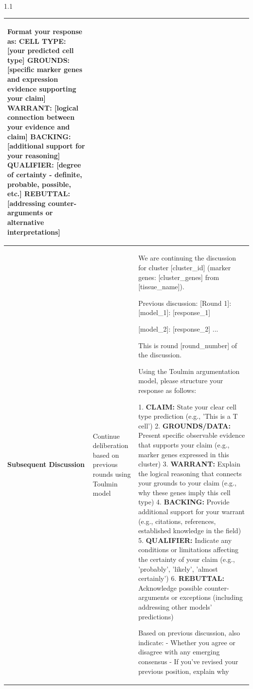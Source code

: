 \documentclass[11pt]{article}
\begin{document}
\begin{landscape}
\begin{spacing}{1.1}
\begin{longtable}{>{\raggedright\arraybackslash}p{2.5cm}>{\raggedright\arraybackslash}p{3cm}>{\raggedright\arraybackslash}p{15cm}}
\begin{tcolorbox}[colback=white,colframe=naturelightgray,boxrule=0.5pt,arc=0pt,left=5pt,right=5pt,top=5pt,bottom=5pt]
Format your response as:
\textbf{CELL TYPE:} [your predicted cell type]
\textbf{GROUNDS:} [specific marker genes and expression evidence supporting your claim]
\textbf{WARRANT:} [logical connection between your evidence and claim]
\textbf{BACKING:} [additional support for your reasoning]
\textbf{QUALIFIER:} [degree of certainty - definite, probable, possible, etc.]
\textbf{REBUTTAL:} [addressing counter-arguments or alternative interpretations]
\end{tcolorbox} \\
\midrule

\textbf{Subsequent Discussion} & Continue deliberation based on previous rounds using Toulmin model &
\begin{tcolorbox}[colback=white,colframe=naturelightgray,boxrule=0.5pt,arc=0pt,left=5pt,right=5pt,top=5pt,bottom=5pt]
\footnotesize
We are continuing the discussion for cluster [cluster\_id] (marker genes: [cluster\_genes] from [tissue\_name]).

Previous discussion:
[Round 1]:
[model\_1]:
[response\_1]

[model\_2]:
[response\_2]
...

This is round [round\_number] of the discussion.

Using the Toulmin argumentation model, please structure your response as follows:

1. \textbf{CLAIM:} State your clear cell type prediction (e.g., 'This is a T cell')
2. \textbf{GROUNDS/DATA:} Present specific observable evidence that supports your claim (e.g., marker genes expressed in this cluster)
3. \textbf{WARRANT:} Explain the logical reasoning that connects your grounds to your claim (e.g., why these genes imply this cell type)
4. \textbf{BACKING:} Provide additional support for your warrant (e.g., citations, references, established knowledge in the field)
5. \textbf{QUALIFIER:} Indicate any conditions or limitations affecting the certainty of your claim (e.g., 'probably', 'likely', 'almost certainly')
6. \textbf{REBUTTAL:} Acknowledge possible counter-arguments or exceptions (including addressing other models' predictions)

Based on previous discussion, also indicate:
- Whether you agree or disagree with any emerging consensus
- If you've revised your previous position, explain why


\end{tcolorbox}
\end{longtable}
\end{spacing}
\end{landscape}
\end{document}
